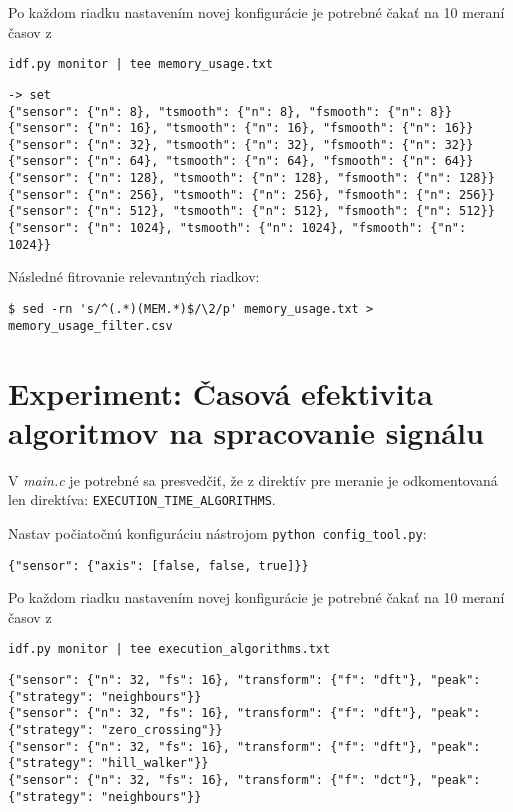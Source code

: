 Po každom riadku nastavením novej konfigurácie je potrebné čakať na 10 meraní časov z 
\begin{lstlisting}[style=messages]
idf.py monitor | tee memory_usage.txt
\end{lstlisting}

\begin{lstlisting}[style=messages]
-> set
{"sensor": {"n": 8}, "tsmooth": {"n": 8}, "fsmooth": {"n": 8}}
{"sensor": {"n": 16}, "tsmooth": {"n": 16}, "fsmooth": {"n": 16}}
{"sensor": {"n": 32}, "tsmooth": {"n": 32}, "fsmooth": {"n": 32}}
{"sensor": {"n": 64}, "tsmooth": {"n": 64}, "fsmooth": {"n": 64}}
{"sensor": {"n": 128}, "tsmooth": {"n": 128}, "fsmooth": {"n": 128}}
{"sensor": {"n": 256}, "tsmooth": {"n": 256}, "fsmooth": {"n": 256}}
{"sensor": {"n": 512}, "tsmooth": {"n": 512}, "fsmooth": {"n": 512}}
{"sensor": {"n": 1024}, "tsmooth": {"n": 1024}, "fsmooth": {"n": 1024}}
\end{lstlisting}

Následné fitrovanie relevantných riadkov:
\begin{lstlisting}[style=messages]
$ sed -rn 's/^(.*)(MEM.*)$/\2/p' memory_usage.txt > memory_usage_filter.csv
\end{lstlisting}


\section{Experiment: Časová efektivita algoritmov na spracovanie signálu}

V \emph{main.c} je potrebné sa presvedčiť, že z direktív pre meranie je odkomentovaná len direktíva: 
\verb|EXECUTION_TIME_ALGORITHMS|.

Nastav počiatočnú konfiguráciu nástrojom \verb|python config_tool.py|:
\begin{lstlisting}[style=messages]
{"sensor": {"axis": [false, false, true]}}
\end{lstlisting}

Po každom riadku nastavením novej konfigurácie je potrebné čakať na 10 meraní časov z 
\begin{lstlisting}[style=messages]
idf.py monitor | tee execution_algorithms.txt
\end{lstlisting}

\begin{lstlisting}[style=messages]
{"sensor": {"n": 32, "fs": 16}, "transform": {"f": "dft"}, "peak": {"strategy": "neighbours"}}
{"sensor": {"n": 32, "fs": 16}, "transform": {"f": "dft"}, "peak": {"strategy": "zero_crossing"}}
{"sensor": {"n": 32, "fs": 16}, "transform": {"f": "dft"}, "peak": {"strategy": "hill_walker"}}
{"sensor": {"n": 32, "fs": 16}, "transform": {"f": "dct"}, "peak": {"strategy": "neighbours"}}
\end{lstlisting}

